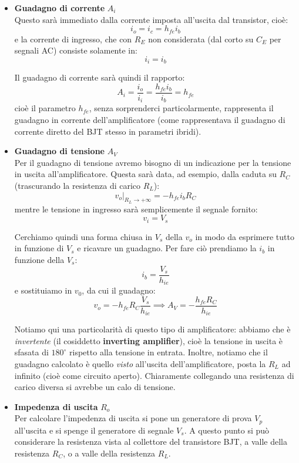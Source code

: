 \documentclass[a4paper,11pt]{article}
\begin{document}
\begin{itemize}
\item \textbf{\textsf{Guadagno di corrente}} $A_i$ \\
Questo sarà immediato dalla corrente imposta all'uscita dal transistor, cioè:
$$
i_o = i_c = h_{fe} i_b
$$
e la corrente di ingresso, che con $R_E$ non considerata (dal corto su $C_E$ per segnali AC) consiste solamente in:
$$
i_i = i_b
$$

Il guadagno di corrente sarà quindi il rapporto:
$$
A_i = \frac{i_o}{i_i} = \frac{h_{fe} i_b}{i_b} = h_{fe}
$$
cioè il parametro $h_{fe}$, senza sorprenderci particolarmente, rappresenta il guadagno in corrente dell'amplificatore (come rappresentava il guadagno di corrente diretto del BJT stesso in parametri ibridi).

\item \textbf{\textsf{Guadagno di tensione}} $A_V$ \\
Per il guadagno di tensione avremo bisogno di un indicazione per la tensione in uscita all'amplificatore. Questa sarà data, ad esempio, dalla caduta su $R_C$ (trascurando la resistenza di carico $R_L$):
$$
v_o \Big|_{R_L \rightarrow +\infty} = - h_{fe} i_b R_C
$$
mentre le tensione in ingresso sarà semplicemente il segnale fornito:
$$
v_i = V_s
$$

Cerchiamo quindi una forma chiusa in $V_s$ della $v_o$ in modo da esprimere tutto in funzione di $V_s$ e ricavare un guadagno. Per fare ciò prendiamo la $i_b$ in funzione della $V_s$:
$$
i_b = \frac{V_s}{h_{ie}}
$$
e sostituiamo in $v_0$, da cui il guadagno:
$$
v_o = -h_{fe} R_C \frac{V_s}{h_{ie}}
\implies
A_V = -\frac{h_{fe} R_C}{h_{ie}}
$$

Notiamo qui una particolarità di questo tipo di amplificatore: abbiamo che è \textit{invertente} (il cosiddetto \textbf{inverting amplifier}), cioè la tensione in uscita è sfasata di $180^\circ$ rispetto alla tensione in entrata. Inoltre, notiamo che il guadagno calcolato è quello \textit{visto} all'uscita dell'amplificatore, posta la $R_L$ ad infinito (cioè come circuito aperto). Chiaramente collegando una resistenza di carico diversa si avrebbe un calo di tensione. 

\item \textbf{\textsf{Impedenza di uscita}} $R_o$ \\
Per calcolare l'impedenza di uscita si pone un generatore di prova $V_p$ all'uscita e si spenge il generatore di segnale $V_s$. A questo punto si può considerare la resistenza vista al collettore del transistore BJT, a valle della resistenza $R_C$, o a valle della resistenza $R_L$.


\end{itemize}
\end{document}
